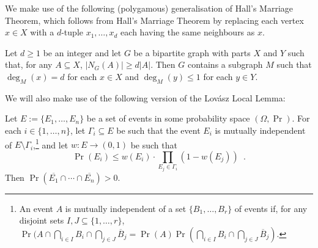 \documentclass{patmorin}
\begin{document}
We make use of the following (polygamous) generalisation of Hall's Marriage Theorem, which follows from Hall's Marriage Theorem by replacing each vertex $x\in X$ with a $d$-tuple $x_1,\ldots,x_d$ each having the same neighbours as $x$.



\begin{cor}\label{d_hall}
  Let $d\ge 1$ be an integer and let $G$ be a bipartite graph with parts $X$ and $Y$ such that, for any $A\subseteq X$, $|N_G(A)|\ge d|A|$.  Then $G$ contains a subgraph $M$ such that $\deg_M(x)=d$ for each $x\in X$ and $\deg_M(y)\le 1$ for each $y\in Y$.
\end{cor}

We will also make use of the following version of the Lovász Local Lemma:

\begin{lem}\label{weighted_lovasz}
  Let $E:=\{E_1,\ldots,E_n\}$ be a set of events in some probability space $(\Omega,\Pr)$.  For each $i\in\{1,\ldots,n\}$, let $\Gamma_i\subseteq E$ be such that the event $E_i$ is mutually independent of $E\setminus \Gamma_i$,\footnote{An event $A$ is mutually independent of a set $\{B_1,\ldots,B_r\}$ of events if, for any disjoint sets $I,J\subseteq\{1,\ldots,r\}$, $\Pr(A\cap\bigcap_{i\in I} B_i\cap\bigcap_{j\in J} \overline{B}_j=\Pr(A)\Pr(\bigcap_{i\in I} B_i\cap\bigcap_{j\in J} \overline{B}_j)$.} and let $w:E\to(0,1)$ be such that
  \[
      \Pr(E_i) \le w(E_i)\cdot\prod_{E_j\in\Gamma_i}(1-w(E_j))  \enspace .
  \]
  Then $\Pr(\overline{E_1}\cap\cdots\cap\overline{E_n}) > 0$.
\end{lem}
\end{document}
